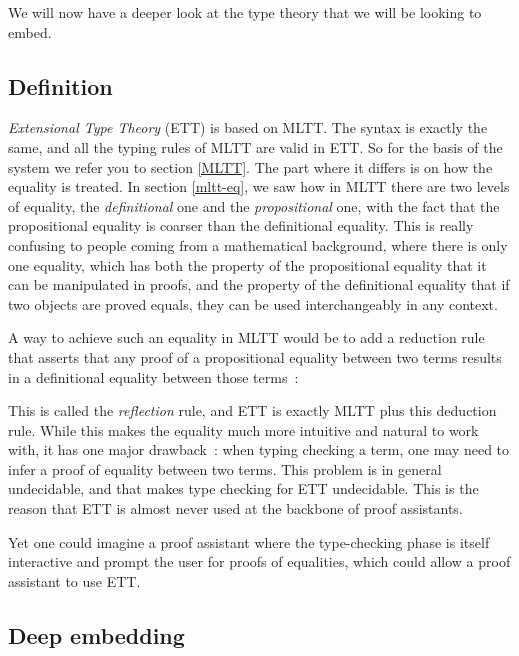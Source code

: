 
We will now have a deeper look at the type theory that we will be looking to
embed.

\subsection{Definition}\label{ETT-def}

\emph{Extensional Type Theory} (ETT) is based on MLTT. The syntax is exactly
the same, and all the typing rules of MLTT are valid in ETT. So for the basis
of the system we refer you to section \ref{MLTT}. The part where it differs is
on how the equality is treated. In section \ref{mltt-eq}, we saw how in MLTT
there are two levels of equality, the \emph{definitional} one and the
\emph{propositional} one, with the fact that the propositional equality is
coarser than the definitional equality. This is really confusing to people
coming from a mathematical background, where there is only one equality, which
has both the property of the propositional equality that it can be manipulated
in proofs, and the property of the definitional equality that if two objects
are proved equals, they can be used interchangeably in any context.

A way to achieve such an equality in MLTT would be to add a reduction rule that
asserts that any proof of a propositional equality between two terms results in
a definitional equality between those terms~:

\begin{center}\begin{prooftree}
\end{prooftree}\end{center}

This is called the \emph{reflection} rule, and ETT is exactly MLTT plus this
deduction rule. While this makes the equality much more intuitive and natural
to work with, it has one major drawback~: when typing checking a term, one may
need to infer a proof of equality between two terms. This problem is in general
undecidable, and that makes type checking for ETT undecidable. This is the
reason that ETT is almost never used at the backbone of proof assistants.

Yet one could imagine a proof assistant where the type-checking phase is itself
interactive and prompt the user for proofs of equalities, which could allow a
proof assistant to use ETT.

\subsection{Deep embedding}\label{ETT-deep}

